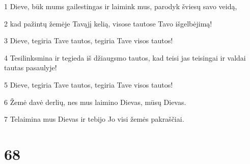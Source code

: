 \par 1 Dieve, būk mums gailestingas ir laimink mus, parodyk šviesų savo veidą, 
\par 2 kad pažintų žemėje Tavąjį kelią, visose tautose Tavo išgelbėjimą! 
\par 3 Dieve, tegiria Tave tautos, tegiria Tave visos tautos! 
\par 4 Tesilinksmina ir tegieda iš džiaugsmo tautos, kad teisi jas teisingai ir valdai tautas pasaulyje! 
\par 5 Dieve, tegiria Tave tautos, tegiria Tave visos tautos! 
\par 6 Žemė davė derlių, nes mus laimino Dievas, mūsų Dievas. 
\par 7 Telaimina mus Dievas ir tebijo Jo visi žemės pakraščiai.



\chapter{68}


